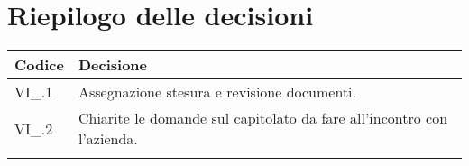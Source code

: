 \newpage

\section{Riepilogo delle decisioni \hfil}
{
	\setlength{\freewidth}{\dimexpr\textwidth-4\tabcolsep}
	\renewcommand{\arraystretch}{1.5}
	\setlength{\aboverulesep}{0pt}
	\setlength{\belowrulesep}{0pt}
	\begin{longtable}{L{.3\freewidth} L{.7\freewidth}}
		\toprule 
		\textbf{Codice} & \textbf{Decisione}\\
		\toprule
		\endhead
		
		VI\_\DataMeeting{}.1 & Assegnazione stesura e revisione documenti. \\  
		VI\_\DataMeeting{}.2 & Chiarite le domande sul capitolato da fare all'incontro con l'azienda. \\
		
		\bottomrule
		\hiderowcolors
	\end{longtable}
}